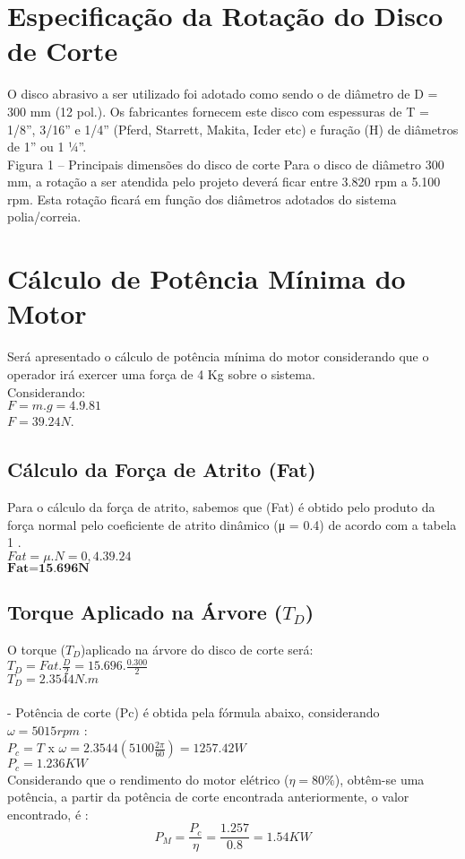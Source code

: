 \documentclass[11pt,a4paper]{report}
\begin{document}
\chapter{Especifica\c{c}\~ao da Rota\c{c}\~ao do Disco de Corte}
O disco abrasivo a ser utilizado foi adotado como sendo o de di\^ametro de
D = 300 mm (12 pol.). Os fabricantes fornecem este disco com espessuras de T
= 1/8”, 3/16” e 1/4” (Pferd, Starrett, Makita, Icder etc) e fura\c{c}\~ao (H) de di\^ametros
de 1” ou 1 1⁄4”.\\
Figura 1 – Principais dimens\~oes do disco de corte
Para o disco de di\^ametro 300 mm, a rota\c{c}\~ao a ser atendida pelo projeto
dever\'a ficar entre 3.820 rpm a 5.100 rpm. Esta rota\c{c}\~ao ficar\'a em fun\c{c}\~ao dos
di\^ametros adotados do sistema polia/correia.\\
\chapter{C\'alculo de Pot\^encia M\'inima do Motor}

Ser\'a apresentado o c\'alculo de pot\^encia m\'inima do motor considerando que
o operador ir\'a exercer uma força de 4 Kg sobre o sistema.\\
Considerando:\\
$F = m . g = 4 . 9.81$\\
$F = 39.24 N$.\\
\section{C\'alculo da For\c{c}a de Atrito (Fat)}
Para o c\'alculo da for\c{c}a de atrito, sabemos que (Fat) \'e obtido pelo produto
da for\c{c}a normal pelo coeficiente de atrito din\^amico (μ = 0.4) de acordo com a tabela
1 .\\
$Fat = \mu . N = 0,4 . 39.24$\\
$\textbf{Fat=15.696N}$\\
\section{Torque Aplicado na \'Arvore ($T_D$)}
O torque ($T_D$)aplicado na árvore do disco de corte será:\\
$T_D= Fat . \frac{D}{2} = 15.696 . \frac{0.300}{2}$\\
$T_D = 2.3544 N.m$\\\\
- Pot\^encia de corte (Pc) \'e obtida pela f\'ormula abaixo, considerando\\
$\omega=5015 rpm$ :\\
$P_c = T$ x $\omega=2.3544(5100 \frac{2\pi}{60})=1257.42W $\\
$P_c=1.236KW$\\
Considerando que o rendimento do motor elétrico ($\eta = 80\%$), obt\^em-se
uma pot\^encia, a partir da pot\^encia de corte encontrada anteriormente, o valor
encontrado, \'e :\\
$$P_M=\frac{P_c}{\eta}=\frac{1.257}{0.8}=1.54KW$$
\end{document}

